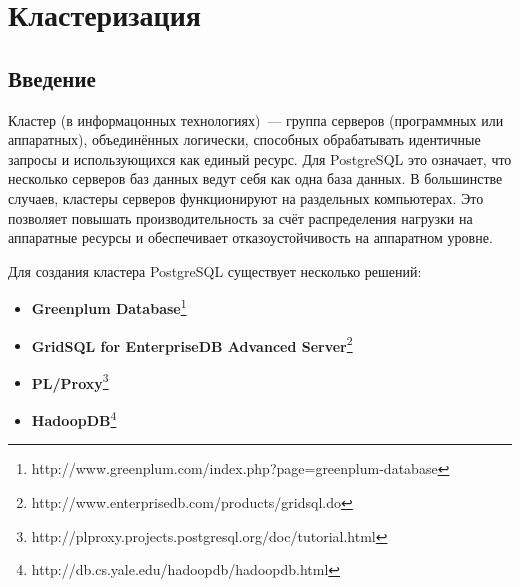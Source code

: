 \chapter{Кластеризация}
\section{Введение}
Кластер (в информацонных технологиях)~--- группа серверов (программных или аппаратных), объединённых логически, 
способных обрабатывать идентичные запросы и использующихся как единый ресурс. Для PostgreSQL это означает, что несколько серверов 
баз данных ведут себя как одна база данных. В большинстве случаев, кластеры серверов функционируют на раздельных компьютерах. 
Это позволяет повышать производительность за счёт распределения нагрузки на аппаратные ресурсы и обеспечивает отказоустойчивость 
на аппаратном уровне.

Для создания кластера PostgreSQL существует несколько решений:
\begin{itemize}
\item \textbf{Greenplum Database}\footnote{http://www.greenplum.com/index.php?page=greenplum-database}
\item \textbf{GridSQL for EnterpriseDB Advanced Server}\footnote{http://www.enterprisedb.com/products/gridsql.do}
\item \textbf{PL/Proxy}\footnote{http://plproxy.projects.postgresql.org/doc/tutorial.html}
\item \textbf{HadoopDB}\footnote{http://db.cs.yale.edu/hadoopdb/hadoopdb.html}
\end{itemize}